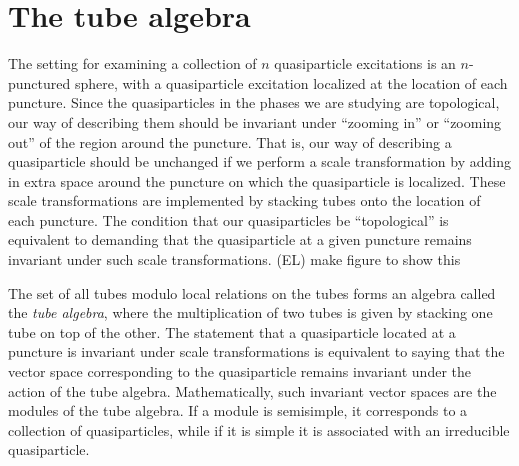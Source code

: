 \documentclass[12pt,a4paper]{article}
\newcommand{\zt}{\mathbb{Z}_2}
\newcommand{\ethan}[1]{{\color{amethyst}\footnotesize{(EL) #1}}}
\begin{document}




\section{The tube algebra} \label{tube_alg}


The setting for examining a collection of $n$ quasiparticle excitations is an $n$-punctured sphere, with a quasiparticle excitation localized at the location of each puncture. 
Since the quasiparticles in the phases we are studying are topological, our way of describing them should be invariant under ``zooming in'' or ``zooming out'' of the region around the puncture. That is, our way of describing a quasiparticle should be unchanged if we perform a scale transformation by adding in extra space around the puncture on which the quasiparticle is localized. These scale transformations are implemented by stacking tubes onto the location of each puncture. The condition that our quasiparticles be ``topological'' is equivalent to demanding that the quasiparticle at a given puncture remains invariant under such scale transformations. \ethan{make figure to show this}


The set of all tubes modulo local relations on the tubes forms an algebra called the {\it tube algebra}, where the multiplication of two tubes is given by stacking one tube on top of the other. The statement that a quasiparticle located at a puncture is invariant under scale transformations is equivalent to saying that the vector space corresponding to the quasiparticle remains invariant under the action of the tube algebra. Mathematically, such invariant vector spaces are the modules of the tube algebra. If a module is semisimple, it corresponds to a collection of quasiparticles, while if it is simple it is associated with an irreducible quasiparticle. 
\end{document}
